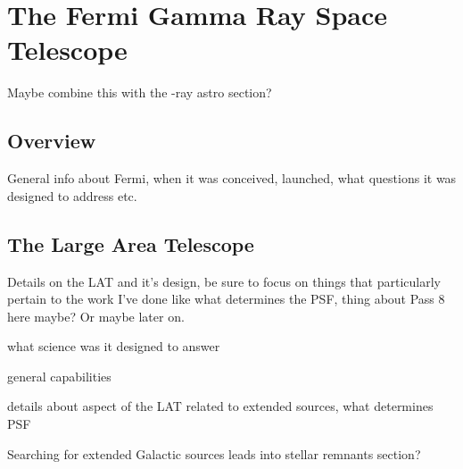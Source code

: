 \chapter{The Fermi Gamma Ray Space Telescope}
\label{chap:LAT}

Maybe combine this with the \g -ray astro section?
\section{Overview}
General info about Fermi, when it was conceived, launched, what questions it was designed to address etc.
\section{The Large Area Telescope}
Details on the LAT and it's design, be sure to focus on things that particularly pertain to the work I've done like what determines the PSF, thing about Pass 8 here maybe? Or maybe later on. 

what science was it designed to answer

general capabilities

details about aspect of the LAT related to extended sources, what determines PSF

Searching for extended Galactic sources leads into stellar remnants section?